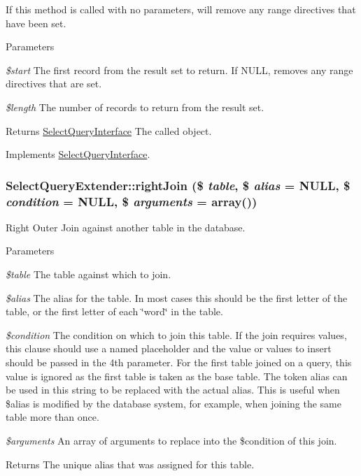If this method is called with no parameters, will remove any range directives that have been set.


\begin{DoxyParams}{Parameters}
\item[{\em \$start}]The first record from the result set to return. If NULL, removes any range directives that are set. \item[{\em \$length}]The number of records to return from the result set. \end{DoxyParams}
\begin{DoxyReturn}{Returns}
\hyperlink{interfaceSelectQueryInterface}{SelectQueryInterface} The called object. 
\end{DoxyReturn}


Implements \hyperlink{interfaceSelectQueryInterface_a028f87f97fb72e0e43050740fd323181}{SelectQueryInterface}.\hypertarget{classSelectQueryExtender_af2012b63276cf32b2422d342d257c835}{
\subsubsection[{rightJoin}]{\setlength{\rightskip}{0pt plus 5cm}SelectQueryExtender::rightJoin (\$ {\em table}, \/  \$ {\em alias} = {\ttfamily NULL}, \/  \$ {\em condition} = {\ttfamily NULL}, \/  \$ {\em arguments} = {\ttfamily array()})}}
\label{classSelectQueryExtender_af2012b63276cf32b2422d342d257c835}
Right Outer Join against another table in the database.


\begin{DoxyParams}{Parameters}
\item[{\em \$table}]The table against which to join. \item[{\em \$alias}]The alias for the table. In most cases this should be the first letter of the table, or the first letter of each \char`\"{}word\char`\"{} in the table. \item[{\em \$condition}]The condition on which to join this table. If the join requires values, this clause should use a named placeholder and the value or values to insert should be passed in the 4th parameter. For the first table joined on a query, this value is ignored as the first table is taken as the base table. The token alias can be used in this string to be replaced with the actual alias. This is useful when \$alias is modified by the database system, for example, when joining the same table more than once. \item[{\em \$arguments}]An array of arguments to replace into the \$condition of this join. \end{DoxyParams}
\begin{DoxyReturn}{Returns}
The unique alias that was assigned for this table. 
\end{DoxyReturn}


